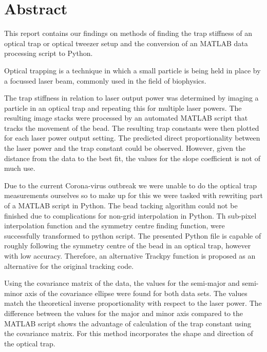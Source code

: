 \section{Abstract}
This report contains our findings on methods of finding the trap stiffness of an optical trap or optical tweezer setup and the conversion of an MATLAB data processing script to Python. 

Optical trapping is a technique in which a small particle is being held in place by a focussed laser beam, commonly used in the field of biophysics.

The trap stiffness in relation to laser output power was determined by imaging a particle in an optical trap and repeating this for multiple laser powers. The resulting image stacks were processed by an automated MATLAB script that tracks the movement of the bead. The resulting trap constants were then plotted for each laser power output setting. The predicted direct proportionality between the laser power and the trap constant could be observed. However, given the distance from the data to the best fit, the values for the slope coefficient is not of much use.

Due to the current Corona-virus outbreak we were unable to do the optical trap measurements ourselves so to make up for this we were tasked with rewriting part of a MATLAB script in Python. The bead tacking algorithm could not be finished due to complications for non-grid interpolation in Python. Th sub-pixel interpolation function and the symmetry centre finding function, were successfully transformed to python script. The presented Python file is capable of roughly following the symmetry centre of the bead in an optical trap, however with low accuracy. Therefore, an alternative Trackpy function is proposed as an alternative for the original tracking code.

Using the covariance matrix of the data, the values for the semi-major and semi-minor axis of the covariance ellipse were found for both data sets. The values match the theoretical inverse proportionality with respect to the laser power. The difference between the values for the major and minor axis compared to the MATLAB script shows the advantage of calculation of the trap constant using the covariance matrix. For this method incorporates the shape and direction of the optical trap.

